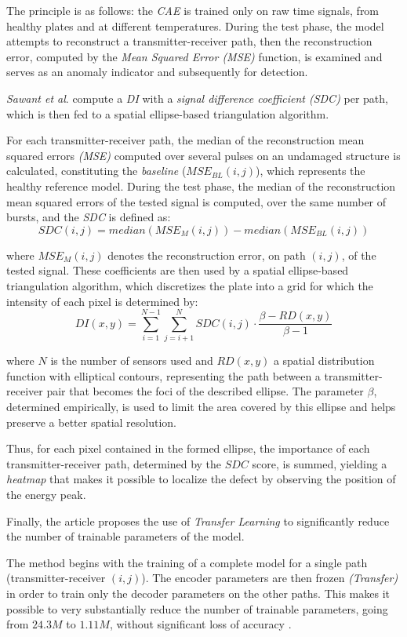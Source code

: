 \documentclass[12pt]{article}
\begin{document}
The principle is as follows: the \textit{CAE} is trained only on raw time signals, from healthy plates and at different temperatures. During the test phase, the model attempts to reconstruct a transmitter-receiver path, then the reconstruction error, computed by the \textit{Mean Squared Error (MSE)} function, is examined and serves as an anomaly indicator and subsequently for detection. 
 
\textit{Sawant et al}. compute a \textit{DI} with a \textit{signal difference coefficient (SDC)} per path, which is then fed to a spatial ellipse-based triangulation algorithm. 
 
For each transmitter-receiver path, the median of the reconstruction mean squared errors \textit{(MSE)} computed over several pulses on an undamaged structure is calculated, constituting the \textit{baseline} ($MSE_{BL}(i,j)$), which represents the healthy reference model. During the test phase, the median of the reconstruction mean squared errors of the tested signal is computed, over the same number of bursts, and the \textit{SDC} is defined as:
$$
SDC(i,j) = median(MSE_M(i,j)) - median(MSE_{BL}(i,j))
$$
 
where $MSE_M(i,j)$ denotes the reconstruction error, on path $(i,j)$, of the tested signal. These coefficients are then used by a spatial ellipse-based triangulation algorithm, which discretizes the plate into a grid for which the intensity of each pixel is determined by: 
$$
DI(x, y) = \sum_{i=1}^{N-1} \sum_{j=i+1}^{N} SDC(i,j) \cdot \frac{\beta - RD(x, y)}{\beta - 1} 
$$
 
where $N$ is the number of sensors used and $RD(x,y)$ a spatial distribution function with elliptical contours, representing the path between a transmitter-receiver pair that becomes the foci of the described ellipse. The parameter $\beta$, determined empirically, is used to limit the area covered by this ellipse and helps preserve a better spatial resolution.
 
Thus, for each pixel contained in the formed ellipse, the importance of each transmitter-receiver path, determined by the $SDC$ score, is summed, yielding a \textit{heatmap} that makes it possible to localize the defect by observing the position of the energy peak.
 
Finally, the article proposes the use of \textit{Transfer Learning} to significantly reduce the number of trainable parameters of the model. 
 
The method begins with the training of a complete model for a single path (transmitter-receiver $(i,j)$). The encoder parameters are then frozen \textit{(Transfer)} in order to train only the decoder parameters on the other paths. This makes it possible to very substantially reduce the number of trainable parameters, going from $24.3M$ to $1.11M$, without significant loss of accuracy \cite{SAWANT2023106931}. 
 
\end{document}
